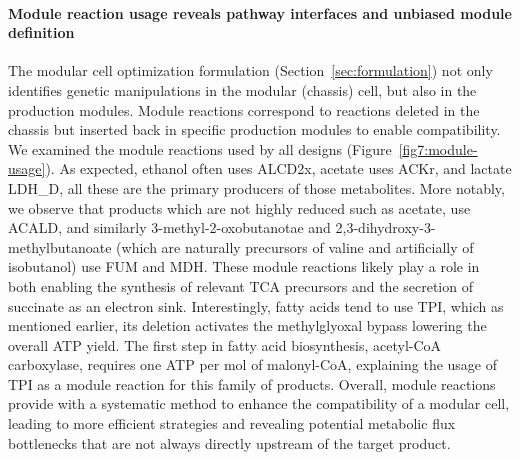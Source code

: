 \documentclass[12pt]{article}
\begin{document}
{\paragraph{Module reaction usage reveals pathway interfaces and unbiased module definition}
The modular cell optimization formulation (Section~\ref{sec:formulation}) not only identifies genetic manipulations in the modular (chassis) cell, but also in the production modules.
Module reactions correspond to reactions deleted in the chassis but inserted back in specific production modules to enable compatibility.
We examined the module reactions used by all designs (Figure~\ref{fig7:module-usage}).
As expected, ethanol often uses ALCD2x, acetate uses ACKr, and lactate LDH\_D, all these are the primary producers of those metabolites.
More notably, we observe that products which are not highly reduced such as acetate, use ACALD, and similarly 3-methyl-2-oxobutanotae and 2,3-dihydroxy-3-methylbutanoate (which are naturally precursors of valine and artificially of isobutanol\citep{atsumi2008,atsumi2010}) use FUM and MDH.
These module reactions likely play a role in both enabling the synthesis of relevant TCA precursors and the secretion of succinate as an electron sink.
Interestingly, fatty acids tend to use TPI, which as mentioned earlier, its deletion activates the methylglyoxal bypass lowering the overall ATP yield.
The first step in fatty acid biosynthesis, acetyl-CoA carboxylase, requires one ATP per mol of malonyl-CoA, explaining the usage of TPI as a module reaction for this family of products.
Overall, module reactions provide with a systematic method to enhance the compatibility of a modular cell, leading to more efficient strategies and revealing potential metabolic flux bottlenecks that are not always directly upstream of the target product.

}
\end{document}
